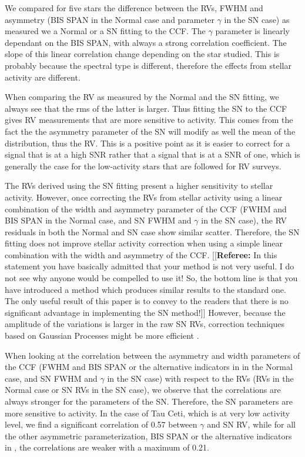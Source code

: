\documentclass[11pt, oneside]{article}
\def\kms{\hbox{\,km\,s$^{-1}$}}       %
\newcommand{\comment}[1]{{\color{red}[[\textbf{Referee: }#1]]}}
\begin{document}
We compared for five stars the difference between the RVs, FWHM and asymmetry (BIS SPAN in the Normal case and parameter $\gamma$ in the SN case) as measured we a Normal or a SN fitting to the CCF. The $\gamma$ parameter is linearly dependant on the BIS SPAN, with always a strong correlation coefficient. 
The slope of this linear correlation change depending on the star studied. This is probably because the spectral type is different, therefore the effects from stellar activity are different.

When comparing the RV as measured by the Normal and the SN fitting, we always see that the rms of the latter is larger. Thus fitting the SN to the CCF gives RV measurements that are more sensitive to activity. This comes from the fact the the asymmetry parameter of the SN will modify as well the mean of the distribution, thus the RV. This is a positive point as it is easier to correct for a signal that is at a high SNR rather that a signal that is at a SNR of one, which is generally the case for the low-activity stars that are followed for RV surveys.

The RVs derived using the SN fitting present a higher sensitivity to stellar activity. However, once correcting the RVs from stellar activity using a linear combination of the width and asymmetry parameter of the CCF (FWHM and BIS SPAN in the Normal case, and SN FWHM and $\gamma$ in the SN case), the RV residuals in both the Normal and SN case show similar scatter. Therefore, the SN fitting does not improve stellar activity correction when using a simple linear combination with the width and asymmetry of the CCF. 
\comment{In this statement you have basically admitted that your method is not very useful. I do not see why anyone would be compelled to use it!
So, the bottom line is that you have introduced a method which produces similar results to the standard one. The only useful result of this paper is to convey to the readers that there is no significant advantage in implementing the SN method!}
However, because the amplitude of the variations is larger in the raw SN RVs, correction techniques based on Gaussian Processes might be more efficient \citep[][]{Haywood-2014,Faria-2016a}. 

When looking at the correlation between the asymmetry and width parameters of the CCF (FWHM and BIS SPAN or the alternative indicators in \citet{Figueira-2013} in the Normal case, and SN FWHM and $\gamma$ in the SN case) with respect to the RVs (RVs in the Normal case or SN RVs in the SN case), we observe that the correlations are always stronger for the parameters of the SN. Therefore, the SN parameters are more sensitive to activity. In the case of Tau Ceti, which is at very low activity level, we find a significant correlation of 0.57 between $\gamma$ and SN RV, while for all the other asymmetric parameterization, BIS SPAN or the alternative indicators in \citet{Figueira-2013}, the correlations are weaker with a maximum of 0.21.
\end{document}
